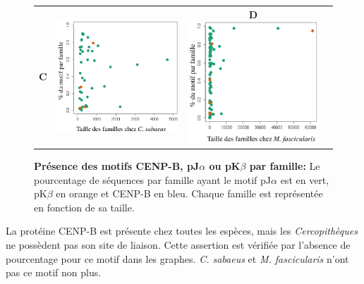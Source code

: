 \documentclass[12pt,a4paper]{article}
\begin{document}
\begin{figure}
\begin{tabular}{cccc}
		\textbf{C} & \includegraphics[scale=0.3]{img/motif_sabaeus.png} & \textbf{D} \includegraphics[scale=0.3]{img/motif_fascicularis.png} \\
	\end{tabular}
	\caption{\textbf{Présence des motifs CENP-B, pJ$\alpha$ ou pK$\beta$ par famille:}
	Le pourcentage de séquences par famille ayant le motif pJ$\alpha$ est en vert, pK$\beta$ en orange et CENP-B en bleu. Chaque famille est représentée en fonction de sa taille.
	\label{fig:motif}
		} 
\end{figure}			
			La protéine CENP-B est présente chez toutes les espèces, mais les \textit{Cercopithèques} ne possèdent pas son site de liaison. Cette assertion est vérifiée par l'absence de pourcentage pour ce motif dans les graphes. \textit{C. sabaeus} et \textit{M. fascicularis} n'ont pas ce motif non plus.
			
\end{document}
